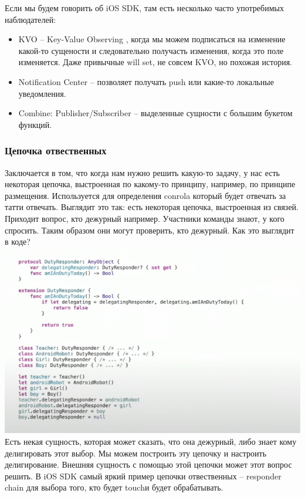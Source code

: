 \documentclass{article}
\begin{document}
    \newline
    Если мы будем говорить об iOS SDK, там есть несколько часто употребимых наблюдателей: 
    \begin{itemize}
        \item KVO -- Key-Value Observing , когда мы можем подписаться на изменение какой-то сущености и следовательно получасть изменения, когда это поле изменяется. Даже привычные will set, не совсем KVO, но похожая история. 
        \item Notification Center -- позволяет получать push или какие-то локальные уведомления. 
        \item Combine: Publisher/Subscriber -- выделенные сущности с большим букетом функций. 
    \end{itemize}
    \subsubsection{Цепочка отвественных}
    Заключается в том, что когда нам нужно решить какую-то задачу, у нас есть некоторая цепочка, выстроенная по какому-то принципу, например, по принципе размещения. Используется для определения conrola который будет отвечать за татти отвечать. 
    \newline
    Выглядит это так: есть некоторая цепочка, выстроенная из связей. Приходит вопрос, кто дежурный например. Участники команды знают, у кого спросить. Таким образом они могут проверить, кто дежурный. Как это выглядит в коде? 
    \newline
    \includegraphics[scale = 0.5]{pic/Снимок экрана 2023-07-29 в 15.07.59.png}
    \newline
    Есть некая сущность, которая может сказать, что она дежурный, либо знает кому делигировать этот выбор. Мы можем построить эту цепочку и настроить делигирование. Внешняя сущность с помощью этой цепочки может этот вопрос решить. 
    \newline
    В iOS SDK самый яркий пример цепочки отвественных -- responder chain для выбора того, кто будет touchи будет обрабатывать. 
\end{document}
